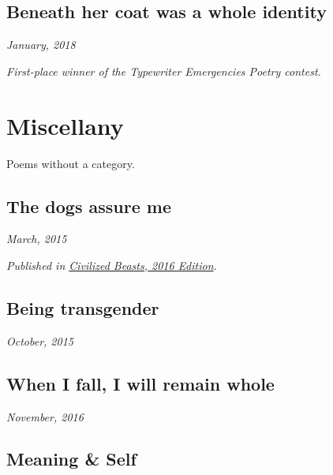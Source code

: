 \documentclass[10pt]{memoir}
\begin{document}
  
  \newpage


  \section{Beneath her coat was a whole identity}

  \hfill\textit{January, 2018}

  

  \textit{First-place winner of the Typewriter Emergencies Poetry contest.}
  \newpage


  \chapter{Miscellany}

  Poems without a category.
  \thispagestyle{empty}
  \newpage


  \section{The dogs assure me}

  \hfill\textit{March, 2015}

  

  \textit{Published in \underline{Civilized Beasts, 2016 Edition}.}
  \cleartoverso


  \section{Being transgender}

  \hfill\textit{October, 2015}

  
  \newpage


  \section{When I fall, I will remain whole}

  \hfill\textit{November, 2016}

  
  \cleartoverso


  \section{Meaning \& Self}
\end{document}
